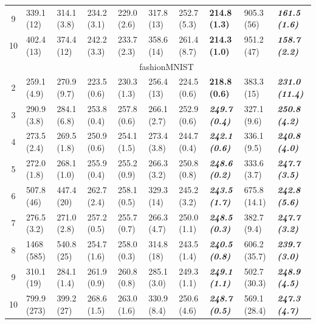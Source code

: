 \begin{table}[t]
{\begin{tabular}{@{}c|lllllll|ll@{}}
9  & 339.1 (12)   & 314.1 (3.8) & 234.2 (3.1) & 229.0 (2.6) & 317.8 (13)  & 252.7 (5.3) & \textbf{214.8 (1.3)} & 905.3 (56) & \textit{\textbf{161.5 (1.6)}} \\
10 & 402.4 (13)   & 374.4 (12)  & 242.2 (3.3) & 233.7 (2.3) & 358.6 (14)  & 261.4 (8.7) & \textbf{214.3 (1.0)} & 951.2 (47) & \textit{\textbf{158.7 (2.2)}}  \\ \midrule
& \multicolumn{9}{c}{\multirow{2}{*}{fashionMNIST}}  \\
& \multicolumn{9}{c}{} \\\midrule
2  & 259.1 (4.9)& 270.9 (9.7) & 223.5 (0.6) & 230.3 (1.3) & 256.4 (13)  & 224.5 (0.6) & \textbf{218.8 (0.6)}          & 383.3 (15)  & \textit{\textbf{231.0 (11.4)}} \\
3  & 290.9 (3.8)& 284.1 (6.8) & 253.8 (0.4) & 257.8 (0.6) & 266.1 (2.7) & 252.9 (0.6) & \textbf{\textit{249.7 (0.4)}} & 327.1 (9.6) & \textit{\textbf{250.8 (4.2)}}  \\
4  & 273.5 (2.4)& 269.5 (1.8) & 250.9 (0.6) & 254.1 (1.5) & 273.4 (3.8) & 244.7 (0.4) & \textbf{\textit{242.1 (0.6)}} & 336.1 (9.5) & \textit{\textbf{240.8 (4.0)}}  \\
5  & 272.0 (1.8)& 268.1 (1.0) & 255.9 (0.4) & 255.2 (0.9) & 266.3 (3.2) & 250.8 (0.8) & \textbf{\textit{248.6 (0.2)}} & 333.6 (3.7) & \textit{\textbf{247.7 (3.5)}}  \\
6  & 507.8 (46) & 447.4 (20)  & 262.7 (2.4) & 258.1 (0.5) & 329.3 (14)  & 245.2 (3.2) & \textbf{\textit{243.5 (1.7)}} & 675.8 (14.1)& \textit{\textbf{242.8 (5.6)}}  \\
7  & 276.5 (3.2)& 271.0 (2.8) & 257.2 (0.5) & 255.7 (0.7) & 266.3 (4.7) & 250.0 (1.1) & \textbf{\textit{248.5 (0.3)}} & 382.7 (9.4) & \textit{\textbf{247.7 (3.2)}}  \\
8  & 1468 (585) & 540.8 (25)  & 254.7 (1.6) & 258.0 (0.3) & 314.8 (18)  & 243.5 (1.4) & \textbf{\textit{240.5 (0.8)}} & 606.2 (35.7)& \textit{\textbf{239.7 (3.0)}}  \\
9  & 310.1 (19) & 284.1 (1.4) & 261.9 (0.9) & 260.8 (0.8) & 285.1 (3.0) & 249.3 (1.1) & \textbf{\textit{249.1 (1.1)}} & 502.7 (30.3)& \textit{\textbf{248.9 (4.5)}}  \\
10 & 799.9 (273)& 399.2 (27)  & 268.6 (1.5) & 263.0 (1.6) & 330.9 (8.4) & 250.6 (4.6) & \textbf{\textit{248.7 (0.5)}} & 569.1 (28.4)& \textit{\textbf{247.3 (4.7)}}   \\
\bottomrule
\end{tabular}
}
\end{table}


